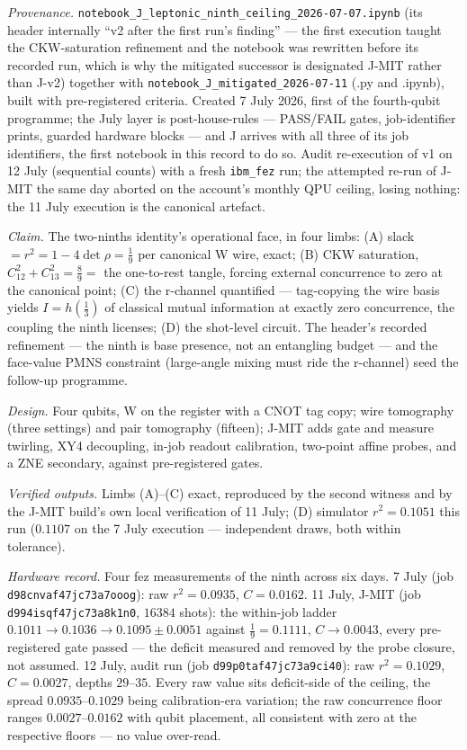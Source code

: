 \emph{Provenance.} \texttt{notebook\_J\_leptonic\_ninth\_ceiling\_2026-07-07.ipynb} (its header
internally ``v2 after the first run's finding'' --- the first execution taught the
CKW-saturation refinement and the notebook was rewritten before its recorded run, which is why
the mitigated successor is designated J-MIT rather than J-v2) together with
\texttt{notebook\_J\_mitigated\_2026-07-11} (.py and .ipynb), built with pre-registered criteria.
Created 7 July 2026, first of the fourth-qubit programme; the July layer is post-house-rules ---
PASS/FAIL gates, job-identifier prints, guarded hardware blocks --- and J arrives with all three
of its job identifiers, the first notebook in this record to do so. Audit re-execution of v1 on
12 July (sequential counts) with a fresh \texttt{ibm\_fez} run; the attempted re-run of J-MIT the
same day aborted on the account's monthly QPU ceiling, losing nothing: the 11 July execution is
the canonical artefact.

\emph{Claim.} The two-ninths identity's operational face, in four limbs: (A) slack
$= r^{2} = 1 - 4\det\rho = \tfrac19$ per canonical W wire, exact; (B) CKW saturation,
$C^{2}_{12} + C^{2}_{13} = \tfrac89 = $ the one-to-rest tangle, forcing external concurrence to
zero at the canonical point; (C) the r-channel quantified --- tag-copying the wire basis yields
$I = h(\tfrac13)$ of classical mutual information at exactly zero concurrence, the coupling the
ninth licenses; (D) the shot-level circuit. The header's recorded refinement --- the ninth is
base presence, not an entangling budget --- and the face-value PMNS constraint (large-angle
mixing must ride the r-channel) seed the follow-up programme.

\emph{Design.} Four qubits, W on the register with a CNOT tag copy; wire tomography (three
settings) and pair tomography (fifteen); J-MIT adds gate and measure twirling, XY4 decoupling,
in-job readout calibration, two-point affine probes, and a ZNE secondary, against pre-registered
gates.

\emph{Verified outputs.} Limbs (A)--(C) exact, reproduced by the second witness and by the
J-MIT build's own local verification of 11 July; (D) simulator $r^{2} = 0.1051$ this run
($0.1107$ on the 7 July execution --- independent draws, both within tolerance).

\emph{Hardware record.} Four fez measurements of the ninth across six days. 7 July (job
\texttt{d98cnvaf47jc73a7ooog}): raw $r^{2} = 0.0935$, $C = 0.0162$. 11 July, J-MIT (job
\texttt{d994isqf47jc73a8k1n0}, $16384$ shots): the within-job ladder
$0.1011 \to 0.1036 \to 0.1095 \pm 0.0051$ against $\tfrac19 = 0.1111$, $C \to 0.0043$, every
pre-registered gate passed --- the deficit measured and removed by the probe closure, not
assumed. 12 July, audit run (job \texttt{d99p0taf47jc73a9ci40}): raw $r^{2} = 0.1029$,
$C = 0.0027$, depths $29$--$35$. Every raw value sits deficit-side of the ceiling, the spread
$0.0935$--$0.1029$ being calibration-era variation; the raw concurrence floor ranges
$0.0027$--$0.0162$ with qubit placement, all consistent with zero at the respective floors ---
no value over-read.

